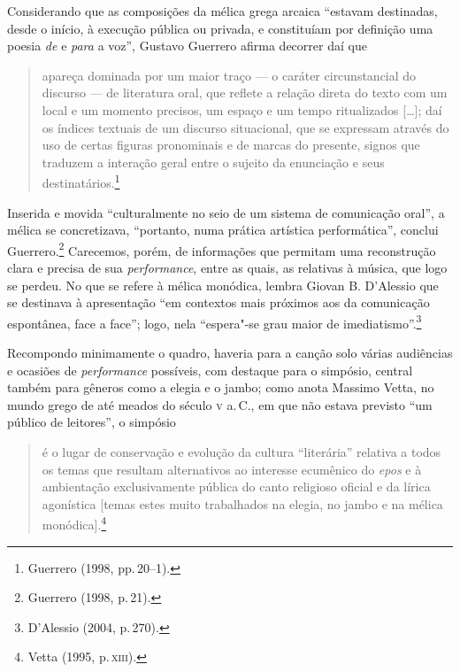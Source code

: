 Considerando que as composições da mélica grega arcaica “estavam destinadas,
desde o início, à execução pública ou privada, e constituíam por definição uma
poesia \emph{de} e \emph{para} a voz”, Gustavo Guerrero
afirma decorrer daí que

\begin{quote}
apareça dominada por um maior traço --- o caráter circunstancial do discurso --- de
literatura oral, que reflete a relação direta do texto com um local e um
momento precisos, um espaço e um tempo ritualizados {[}\ldots{}{]}; daí os índices
textuais de um discurso situacional, que se expressam através do uso de certas
figuras pronominais e de marcas do presente, signos que traduzem a interação
geral entre o sujeito da enunciação e seus destinatários.\footnote{ Guerrero (1998, pp.\,20--1).}
\end{quote}

Inserida e movida “culturalmente no seio de um sistema de comunicação oral”, a
mélica se concretizava, “portanto, numa prática artística performática”,
conclui Guerrero.\footnote{ Guerrero (1998, p.\,21).} Carecemos, porém, de informações que permitam uma
reconstrução clara e precisa de sua \emph{performance}, entre as quais, as
relativas à música, que logo se perdeu. No que se refere à mélica monódica,
lembra Giovan B. D’Alessio que se destinava à apresentação “em
contextos mais próximos aos da comunicação espontânea, face a face”; logo, nela
“espera"-se grau maior de imediatismo”.\footnote{ D’Alessio (2004, p.\,270).} 

Recompondo minimamente o quadro, haveria para a canção solo várias audiências e
 ocasiões de \emph{performance} possíveis, com destaque para o simpósio,
 central também para gêneros como a elegia e o jambo; como anota Massimo Vetta,
 no mundo grego de até meados do século \textsc{v} a.\,C., em que não
 estava previsto “um público de leitores”, o simpósio

\begin{quote}
é o lugar de conservação
e evolução da cultura ``literária'' relativa a todos os temas que resultam
alternativos ao interesse ecumênico do \emph{epos} e à ambientação
exclusivamente pública do canto religioso oficial e da lírica agonística
{[}temas estes muito trabalhados na elegia, no jambo e na mélica monódica{]}.\footnote{ Vetta (1995, p.\,\textsc{xiii}).}
\end{quote}

